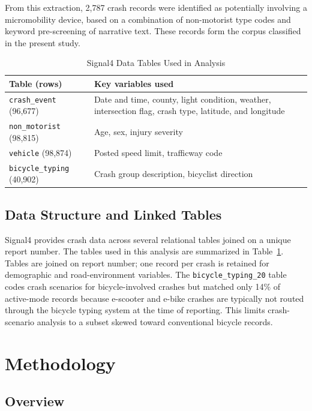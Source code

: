 \documentclass[numbered]{trbunofficial}
\begin{document}
From this extraction, 2,787 crash records were identified as potentially involving a micromobility device, based on a combination of non-motorist type codes and keyword pre-screening of narrative text. These records form the corpus classified in the present study.
\begin{table}
\centering
\caption{Signal4 Data Tables Used in Analysis}
\label{tab:datasources}
\begin{tabular}{lp{4.8cm}}
\toprule
\textbf{Table (rows)} & \textbf{Key variables used} \\
\midrule
\texttt{crash\_event} (96,677) & Date and time, county, light condition, weather, intersection flag, crash type, latitude, and longitude \\
\texttt{non\_motorist} (98,815) & Age, sex, injury severity \\
\texttt{vehicle} (98,874) & Posted speed limit, trafficway code \\
\texttt{bicycle\_typing} (40,902) & Crash group description, bicyclist direction \\
\bottomrule
\end{tabular}
\end{table}
\subsection{Data Structure and Linked Tables}

Signal4 provides crash data across several relational tables joined on a unique report number. The tables used in this analysis are summarized in Table~\ref{tab:datasources}. Tables are joined on report number; one record per crash is retained for demographic and road-environment variables. The \texttt{bicycle\_typing\_20} table codes crash scenarios for bicycle-involved crashes but matched only 14\% of active-mode records because e-scooter and e-bike crashes are typically not routed through the bicycle typing system at the time of reporting. This limits crash-scenario analysis to a subset skewed toward conventional bicycle records.



\section{Methodology}
\label{sec:methods}

\subsection{Overview}
\end{document}
